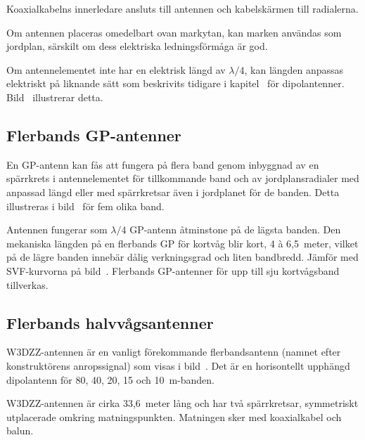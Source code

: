 Koaxialkabelns innerledare ansluts till antennen och kabelskärmen till
radialerna.

Om antennen placeras omedelbart ovan markytan, kan marken användas som
jordplan, särskilt om dess elektriska ledningsförmåga är god.

Om antennelementet inte har en elektrisk längd av \(\lambda/4\), kan
längden anpassas elektriskt på liknande sätt som beskrivits tidigare i
kapitel~ för dipolantenner.
Bild~ illustrerar detta.


\newpage
\subsection{Flerbands GP-antenner}

En GP-antenn kan fås att fungera på flera band genom inbyggnad av en spärrkrets
i antennelementet för tillkommande band och av jordplansradialer med anpassad
längd eller med spärrkretsar även i jordplanet för de banden.
Detta illustreras i bild~ för fem olika band.

Antennen fungerar som \(\lambda/4\) GP-antenn åtminstone på de lägsta banden.
Den mekaniska längden på en flerbands GP för kortvåg blir kort, 4 à 6,5~meter,
vilket på de lägre banden innebär dålig verkningsgrad och liten bandbredd.
Jämför med SVF-kurvorna på bild~.
Flerbands GP-antenner för upp till sju kortvågsband tillverkas.

\clearpage
\subsection{Flerbands halvvågsantenner}
\label{W3DZZ}


W3DZZ-antennen är en vanligt förekommande flerbandsantenn (namnet
efter konstruktörens anropssignal) som visas i bild~.
Det är en horisontellt upphängd dipolantenn för 80, 40, 20, 15 och
10~m-banden.

W3DZZ-antennen är cirka 33,6~meter lång och har två spärrkretsar,
symmetriskt utplacerade omkring matningspunkten.
Matningen sker med koaxialkabel och balun.

